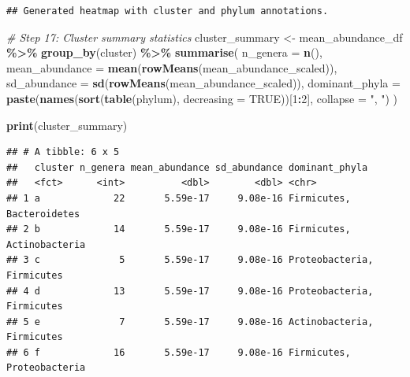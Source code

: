 \documentclass[
]{article}
\newenvironment{Shaded}{\begin{snugshade}}{\end{snugshade}}
\newcommand{\AttributeTok}[1]{\textcolor[rgb]{0.13,0.29,0.53}{#1}}
\newcommand{\CommentTok}[1]{\textcolor[rgb]{0.56,0.35,0.01}{\textit{#1}}}
\newcommand{\ConstantTok}[1]{\textcolor[rgb]{0.56,0.35,0.01}{#1}}
\newcommand{\DecValTok}[1]{\textcolor[rgb]{0.00,0.00,0.81}{#1}}
\newcommand{\FunctionTok}[1]{\textcolor[rgb]{0.13,0.29,0.53}{\textbf{#1}}}
\newcommand{\NormalTok}[1]{#1}
\newcommand{\OtherTok}[1]{\textcolor[rgb]{0.56,0.35,0.01}{#1}}
\newcommand{\SpecialCharTok}[1]{\textcolor[rgb]{0.81,0.36,0.00}{\textbf{#1}}}
\newcommand{\StringTok}[1]{\textcolor[rgb]{0.31,0.60,0.02}{#1}}
\begin{document}
\begin{verbatim}
## Generated heatmap with cluster and phylum annotations.
\end{verbatim}

\begin{Shaded}
\begin{Highlighting}[]
\CommentTok{\# Step 17: Cluster summary statistics}
\NormalTok{cluster\_summary }\OtherTok{\textless{}{-}}\NormalTok{ mean\_abundance\_df }\SpecialCharTok{\%\textgreater{}\%}
  \FunctionTok{group\_by}\NormalTok{(cluster) }\SpecialCharTok{\%\textgreater{}\%}
  \FunctionTok{summarise}\NormalTok{(}
    \AttributeTok{n\_genera =} \FunctionTok{n}\NormalTok{(),}
    \AttributeTok{mean\_abundance =} \FunctionTok{mean}\NormalTok{(}\FunctionTok{rowMeans}\NormalTok{(mean\_abundance\_scaled)),}
    \AttributeTok{sd\_abundance =} \FunctionTok{sd}\NormalTok{(}\FunctionTok{rowMeans}\NormalTok{(mean\_abundance\_scaled)),}
    \AttributeTok{dominant\_phyla =} \FunctionTok{paste}\NormalTok{(}\FunctionTok{names}\NormalTok{(}\FunctionTok{sort}\NormalTok{(}\FunctionTok{table}\NormalTok{(phylum), }\AttributeTok{decreasing =} \ConstantTok{TRUE}\NormalTok{))[}\DecValTok{1}\SpecialCharTok{:}\DecValTok{2}\NormalTok{], }\AttributeTok{collapse =} \StringTok{", "}\NormalTok{)}
\NormalTok{  )}

\FunctionTok{print}\NormalTok{(cluster\_summary)}
\end{Highlighting}
\end{Shaded}

\begin{verbatim}
## # A tibble: 6 x 5
##   cluster n_genera mean_abundance sd_abundance dominant_phyla            
##   <fct>      <int>          <dbl>        <dbl> <chr>                     
## 1 a             22       5.59e-17     9.08e-16 Firmicutes, Bacteroidetes 
## 2 b             14       5.59e-17     9.08e-16 Firmicutes, Actinobacteria
## 3 c              5       5.59e-17     9.08e-16 Proteobacteria, Firmicutes
## 4 d             13       5.59e-17     9.08e-16 Proteobacteria, Firmicutes
## 5 e              7       5.59e-17     9.08e-16 Actinobacteria, Firmicutes
## 6 f             16       5.59e-17     9.08e-16 Firmicutes, Proteobacteria
\end{verbatim}
\end{document}
